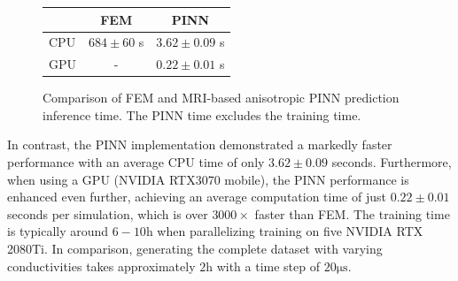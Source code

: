 \begin{figure}
  \centering
  \begin{tabular}{| l | c | c |}
    \hline
     & FEM & PINN \\ \hline
    CPU & $684\pm60$ s & $3.62\pm0.09$ s \\ \hline
    GPU & - & $0.22\pm 0.01$ s \\ \hline
  \end{tabular}
  \caption{Comparison of FEM and MRI-based anisotropic PINN prediction inference time. The PINN time excludes the training time.}
  \label{tab:performance_comparison}
\end{figure}
In contrast, the PINN implementation demonstrated a markedly faster performance with an average CPU time of only $3.62 \pm 0.09$ seconds. Furthermore, when using a GPU (NVIDIA RTX3070 mobile), the PINN performance is enhanced even further, achieving an average computation time of just $0.22 \pm 0.01$ seconds per simulation, which is over $3000\times$ faster than FEM.
The training time is typically around $6-10\mathrm{h}$ when parallelizing training on five NVIDIA RTX 2080Ti. In comparison, generating the complete dataset with varying conductivities takes approximately $2\mathrm{h}$ with a time step of $20\mathrm{\mu s}$.





